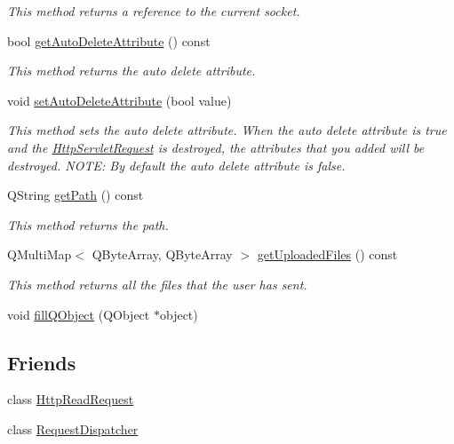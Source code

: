 \begin{DoxyCompactItemize}
\begin{DoxyCompactList}\small\item\em This method returns a reference to the current socket. \end{DoxyCompactList}\item 
bool \hyperlink{class_c_w_f_1_1_http_servlet_request_abe9c009a7010f02552da1370dddd0484}{get\+Auto\+Delete\+Attribute} () const 
\begin{DoxyCompactList}\small\item\em This method returns the auto delete attribute. \end{DoxyCompactList}\item 
void \hyperlink{class_c_w_f_1_1_http_servlet_request_a4f884f904ea3793511087b6311fb9e47}{set\+Auto\+Delete\+Attribute} (bool value)
\begin{DoxyCompactList}\small\item\em This method sets the auto delete attribute. When the auto delete attribute is true and the \hyperlink{class_c_w_f_1_1_http_servlet_request}{Http\+Servlet\+Request} is destroyed, the attributes that you added will be destroyed. N\+O\+T\+E\+: By default the auto delete attribute is false. \end{DoxyCompactList}\item 
Q\+String \hyperlink{class_c_w_f_1_1_http_servlet_request_ad26dd1fc71d21453fc0e28ab602f9603}{get\+Path} () const 
\begin{DoxyCompactList}\small\item\em This method returns the path. \end{DoxyCompactList}\item 
Q\+Multi\+Map$<$ Q\+Byte\+Array, Q\+Byte\+Array $>$ \hyperlink{class_c_w_f_1_1_http_servlet_request_a67e5b7ef1e55618ff787ab3d5e229246}{get\+Uploaded\+Files} () const 
\begin{DoxyCompactList}\small\item\em This method returns all the files that the user has sent. \end{DoxyCompactList}\item 
void \hyperlink{class_c_w_f_1_1_http_servlet_request_a82a05ddb8d91c72a28846ffc0e811ee7}{fill\+Q\+Object} (Q\+Object $\ast$object)
\end{DoxyCompactItemize}
\subsection*{Friends}
\begin{DoxyCompactItemize}
\item 
class \hyperlink{class_c_w_f_1_1_http_servlet_request_a4d54f5003e07e218070a449c22a52c7c}{Http\+Read\+Request}
\item 
class \hyperlink{class_c_w_f_1_1_http_servlet_request_ae82f2dbbf52e70637edba766141fd80e}{Request\+Dispatcher}
\end{DoxyCompactItemize}



